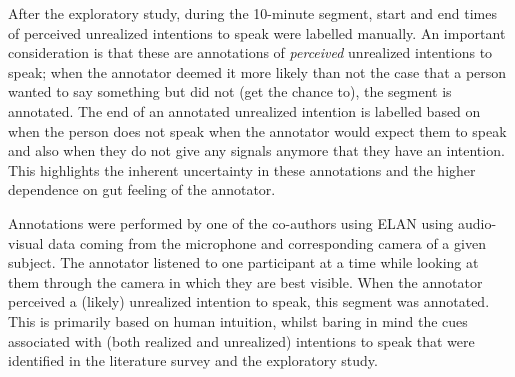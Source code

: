 \documentclass[manuscript,screen,review]{acmart}
\begin{document}

After the exploratory study, during the 10-minute segment, start and end times of perceived unrealized intentions to speak were labelled manually.
An important consideration is that these are annotations of \emph{perceived} unrealized intentions to speak; when the annotator deemed it more likely than not the case that a person wanted to say something but did not (get the chance to), the segment is annotated.  The end of an annotated unrealized intention is labelled based on when the person does not speak when the annotator would expect them to speak and also when they do not give any signals anymore that they have an intention. 
This highlights the inherent uncertainty in these annotations and the higher dependence on gut feeling of the annotator. 

Annotations were performed by one of the co-authors
using ELAN \cite{elan} using audio-visual data coming from the microphone and corresponding camera of a given subject. 
The annotator listened to one participant at a time while looking at them through the camera in which they are best visible. 
When the annotator perceived a (likely) unrealized intention to speak, this segment was annotated. This is primarily based on human intuition, whilst baring in mind the cues associated with (both realized and unrealized) intentions to speak that were identified in the literature survey and the exploratory study.
\end{document}
